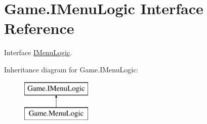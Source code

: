 \hypertarget{interface_game_1_1_i_menu_logic}{}\section{Game.\+I\+Menu\+Logic Interface Reference}
\label{interface_game_1_1_i_menu_logic}


Interface \mbox{\hyperlink{interface_game_1_1_i_menu_logic}{I\+Menu\+Logic}}.  


Inheritance diagram for Game.\+I\+Menu\+Logic\+:\begin{figure}[H]
\begin{center}
\leavevmode
\includegraphics[height=2.000000cm]{interface_game_1_1_i_menu_logic}
\end{center}
\end{figure}
